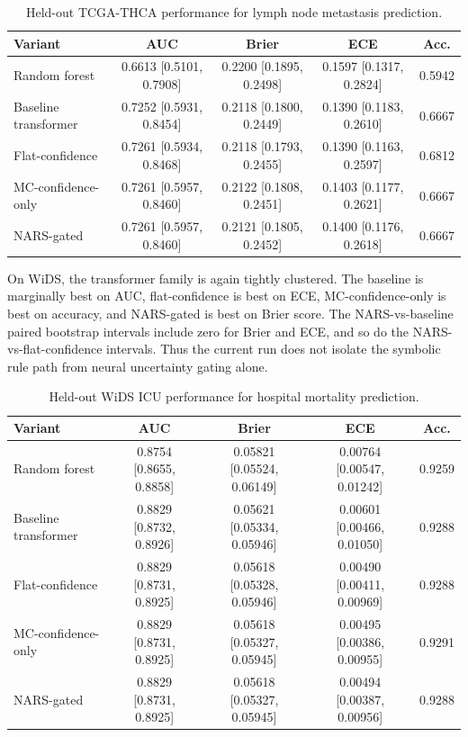 \documentclass{article}
\begin{document}
\begin{table}[t]
\caption{Held-out TCGA-THCA performance for lymph node metastasis prediction.}
\label{tab:tcga_results}
\centering
\scriptsize
\setlength{\tabcolsep}{2.5pt}
\begin{tabular}{@{}lcccc@{}}
\toprule
Variant & AUC & Brier & ECE & Acc. \\
\midrule
Random forest & 0.6613 [0.5101, 0.7908] & 0.2200 [0.1895, 0.2498] & 0.1597 [0.1317, 0.2824] & 0.5942 \\
Baseline transformer & 0.7252 [0.5931, 0.8454] & 0.2118 [0.1800, 0.2449] & 0.1390 [0.1183, 0.2610] & 0.6667 \\
Flat-confidence & 0.7261 [0.5934, 0.8468] & 0.2118 [0.1793, 0.2455] & 0.1390 [0.1163, 0.2597] & 0.6812 \\
MC-confidence-only & 0.7261 [0.5957, 0.8460] & 0.2122 [0.1808, 0.2451] & 0.1403 [0.1177, 0.2621] & 0.6667 \\
NARS-gated & 0.7261 [0.5957, 0.8460] & 0.2121 [0.1805, 0.2452] & 0.1400 [0.1176, 0.2618] & 0.6667 \\
\bottomrule
\end{tabular}
\end{table}

On WiDS, the transformer family is again tightly clustered. The baseline is marginally best on AUC, flat-confidence is best on ECE, MC-confidence-only is best on accuracy, and NARS-gated is best on Brier score. The NARS-vs-baseline paired bootstrap intervals include zero for Brier and ECE, and so do the NARS-vs-flat-confidence intervals. Thus the current run does not isolate the symbolic rule path from neural uncertainty gating alone.

\begin{table}[t]
\caption{Held-out WiDS ICU performance for hospital mortality prediction.}
\label{tab:wids_results}
\centering
\scriptsize
\setlength{\tabcolsep}{2.5pt}
\begin{tabular}{@{}lcccc@{}}
\toprule
Variant & AUC & Brier & ECE & Acc. \\
\midrule
Random forest & 0.8754 [0.8655, 0.8858] & 0.05821 [0.05524, 0.06149] & 0.00764 [0.00547, 0.01242] & 0.9259 \\
Baseline transformer & 0.8829 [0.8732, 0.8926] & 0.05621 [0.05334, 0.05946] & 0.00601 [0.00466, 0.01050] & 0.9288 \\
Flat-confidence & 0.8829 [0.8731, 0.8925] & 0.05618 [0.05328, 0.05946] & 0.00490 [0.00411, 0.00969] & 0.9288 \\
MC-confidence-only & 0.8829 [0.8731, 0.8925] & 0.05618 [0.05327, 0.05945] & 0.00495 [0.00386, 0.00955] & 0.9291 \\
NARS-gated & 0.8829 [0.8731, 0.8925] & 0.05618 [0.05327, 0.05945] & 0.00494 [0.00387, 0.00956] & 0.9288 \\
\bottomrule
\end{tabular}
\end{table}
\end{document}
